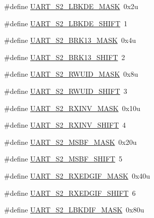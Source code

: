 \begin{DoxyCompactItemize}
\item 
\#define \hyperlink{group___u_a_r_t___register___masks_ga537e0b2cc3f4eb0056498ff63641bc3b}{U\+A\+R\+T\+\_\+\+S2\+\_\+\+L\+B\+K\+D\+E\+\_\+\+M\+A\+SK}~0x2u
\item 
\#define \hyperlink{group___u_a_r_t___register___masks_ga192cec151a02a4a29e46b3c061127434}{U\+A\+R\+T\+\_\+\+S2\+\_\+\+L\+B\+K\+D\+E\+\_\+\+S\+H\+I\+FT}~1
\item 
\#define \hyperlink{group___u_a_r_t___register___masks_gab2b333a78ce968eece87bcecd87a8673}{U\+A\+R\+T\+\_\+\+S2\+\_\+\+B\+R\+K13\+\_\+\+M\+A\+SK}~0x4u
\item 
\#define \hyperlink{group___u_a_r_t___register___masks_ga6b19eb1eefbef73859cc6eec77d863e4}{U\+A\+R\+T\+\_\+\+S2\+\_\+\+B\+R\+K13\+\_\+\+S\+H\+I\+FT}~2
\item 
\#define \hyperlink{group___u_a_r_t___register___masks_gac04113c9c307f88a4e51db472d274eee}{U\+A\+R\+T\+\_\+\+S2\+\_\+\+R\+W\+U\+I\+D\+\_\+\+M\+A\+SK}~0x8u
\item 
\#define \hyperlink{group___u_a_r_t___register___masks_ga9a972894e69ee588eab48c8436be9fde}{U\+A\+R\+T\+\_\+\+S2\+\_\+\+R\+W\+U\+I\+D\+\_\+\+S\+H\+I\+FT}~3
\item 
\#define \hyperlink{group___u_a_r_t___register___masks_ga80b6af8d528290157cd93b8e33402e9e}{U\+A\+R\+T\+\_\+\+S2\+\_\+\+R\+X\+I\+N\+V\+\_\+\+M\+A\+SK}~0x10u
\item 
\#define \hyperlink{group___u_a_r_t___register___masks_ga9e9f9f846534bbefdb7c7b88a66d29fc}{U\+A\+R\+T\+\_\+\+S2\+\_\+\+R\+X\+I\+N\+V\+\_\+\+S\+H\+I\+FT}~4
\item 
\#define \hyperlink{group___u_a_r_t___register___masks_ga864a0b6ff26ed84f04d0b2f36a30468a}{U\+A\+R\+T\+\_\+\+S2\+\_\+\+M\+S\+B\+F\+\_\+\+M\+A\+SK}~0x20u
\item 
\#define \hyperlink{group___u_a_r_t___register___masks_gaf1e853675fb82a43501d259573de5eca}{U\+A\+R\+T\+\_\+\+S2\+\_\+\+M\+S\+B\+F\+\_\+\+S\+H\+I\+FT}~5
\item 
\#define \hyperlink{group___u_a_r_t___register___masks_ga17b9dd16869c5185f2be9c1394fcede5}{U\+A\+R\+T\+\_\+\+S2\+\_\+\+R\+X\+E\+D\+G\+I\+F\+\_\+\+M\+A\+SK}~0x40u
\item 
\#define \hyperlink{group___u_a_r_t___register___masks_gab5a85582d800238efb298c45e578a83e}{U\+A\+R\+T\+\_\+\+S2\+\_\+\+R\+X\+E\+D\+G\+I\+F\+\_\+\+S\+H\+I\+FT}~6
\item 
\#define \hyperlink{group___u_a_r_t___register___masks_ga874d96e3755d584279e6f058522c2c4a}{U\+A\+R\+T\+\_\+\+S2\+\_\+\+L\+B\+K\+D\+I\+F\+\_\+\+M\+A\+SK}~0x80u

\end{DoxyCompactItemize}
